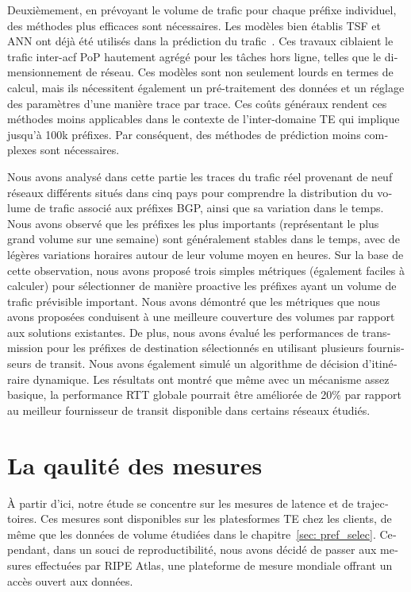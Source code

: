 \begin{otherlanguage}{french}
Deuxièmement, en prévoyant le volume de trafic pour chaque préfixe individuel, des méthodes plus efficaces sont nécessaires.
Les modèles bien établis \acf{TSF} et \acf{ANN} ont déjà été utilisés dans la prédiction du trafic~\cite{Papagiannaki2005, Cortez2006, Otoshi2013}.
Ces travaux ciblaient le trafic inter-acf {PoP} hautement agrégé pour les tâches hors ligne, telles que le dimensionnement de réseau.
Ces modèles sont non seulement lourds en termes de calcul, mais ils nécessitent également un pré-traitement des données et un réglage des paramètres d'une manière trace par trace. 
Ces coûts généraux rendent ces méthodes moins applicables dans le contexte de l'inter-domaine TE qui implique jusqu'à 100k préfixes. Par conséquent, des méthodes de prédiction moins complexes sont nécessaires.

Nous avons analysé dans cette partie les traces du trafic réel provenant de neuf réseaux différents situés dans cinq pays pour comprendre la distribution du volume de trafic associé aux préfixes BGP, ainsi que sa variation dans le temps.
Nous avons observé que les préfixes les plus importants (représentant le plus grand volume sur une semaine) sont généralement stables dans le temps, avec de légères variations horaires autour de leur volume moyen en heures.
Sur la base de cette observation, nous avons proposé trois simples
métriques (également faciles à calculer) pour sélectionner de manière proactive les préfixes ayant un volume de trafic prévisible important.
Nous avons démontré que les métriques que nous avons proposées conduisent à une meilleure couverture des volumes par rapport aux solutions existantes.
De plus, nous avons évalué les performances de transmission pour les préfixes de destination sélectionnés en utilisant plusieurs fournisseurs de transit.
Nous avons également simulé un algorithme de décision d'itinéraire dynamique.
Les résultats ont montré que même avec un mécanisme assez basique, la performance RTT globale pourrait être améliorée de 20\% par rapport au meilleur fournisseur de transit disponible dans certains réseaux étudiés.

\section{La qaulité des mesures}

À partir d'ici, notre étude se concentre sur les mesures de latence et de trajectoires.
Ces mesures sont disponibles sur les platesformes TE chez les clients, de même que les données de volume étudiées dans le chapitre~\ref{sec: pref_selec}.
Cependant, dans un souci de reproductibilité, nous avons décidé de passer aux mesures effectuées par RIPE Atlas, une plateforme de mesure mondiale offrant un accès ouvert aux données. 


\end{otherlanguage}
